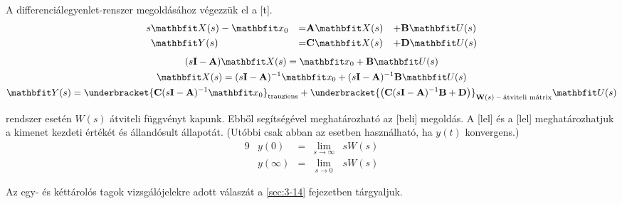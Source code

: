 \documentclass[../main.tex]{subfiles}
\begin{document}
A differenciálegyenlet-renszer megoldásához végezzük el a [t].
\begin{alignat*}{9}
  s & \rvec X(s) - \rvec x_0 & = & \rmat A \rvec X(s) & + & \rmat B \rvec U(s) \\
    & \rvec Y (s)            & = & \rmat C \rvec X(s) & + & \rmat D \rvec U(s)
\end{alignat*}
\begin{gather*}
  (s \rmat I - \rmat A) \rvec X(s) = \rvec x_0 + \rmat B \rvec U(s) \\
  \rvec X(s) = (s \rmat I - \rmat A)^{-1} \rvec x_0 + (s \rmat I - \rmat A)^{-1} \rmat B \rvec U(s) \\
  \rvec Y(s)
  = \underbracket{\rmat C(s \rmat I - \rmat A)^{-1} \rvec x_0}_{\text{tranziens}}
  +  \underbracket{\left( \rmat C ( s \rmat I - \rmat A )^{-1} \rmat B + \rmat D \right)}_{\rmat W(s) \text{ --
      átviteli mátrix}} \rvec U(s)
\end{gather*}

 rendszer esetén $W(s)$ átviteli függvényt kapunk. Ebből
 segítségével meghatározható az
[beli] megoldás. A [lel]
és a [lel] meghatározhatjuk a kimenet kezdeti értékét
és állandósult állapotát. (Utóbbi csak abban az esetben használható,
ha $y(t)$ konvergens.)
\begin{alignat*}{9}
   & y(0)      & = & \lim_{s \to \infty} & s W(s) \\
   & y(\infty) & = & \,\lim_{s \to 0}    & s W(s)
\end{alignat*}

Az egy- és kéttárolós tagok vizsgálójelekre adott válaszát a \ref{sec:3-14}
fejezetben tárgyaljuk.
\end{document}

